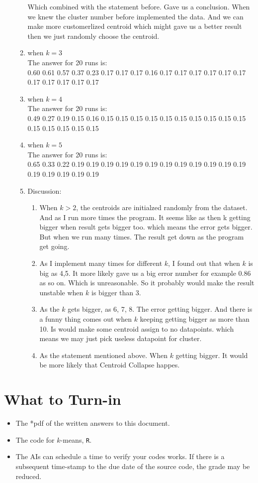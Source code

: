 \documentclass{article}
\begin{document}
\begin{enumerate}
\begin{enumerate}
	Which combined with the statement before. Gave us a conclusion. When we knew the cluster number before implemented the data. And we can make more customerlized centroid which might gave us a better result then we just randomly choose the centroid.
	\item when $k = 3$\\
	The answer for 20 runs is:\\
	0.60 0.61 0.57 0.37 0.23 0.17 0.17 0.17 0.16 0.17 0.17 0.17 0.17 0.17 0.17 0.17 0.17 0.17 0.17 0.17 
	\item when $k = 4$\\
	The answer for 20 runs is:\\
	0.49 0.27 0.19 0.15 0.16 0.15 0.15 0.15 0.15 0.15 0.15 0.15 0.15 0.15 0.15 0.15 0.15 0.15 0.15 0.15 
	\item when $k = 5$ \\
	The answer for 20 runs is:\\
	0.65 0.33 0.22 0.19 0.19 0.19 0.19 0.19 0.19 0.19 0.19 0.19 0.19 0.19 0.19 0.19 0.19 0.19 0.19 0.19
	\item Discussion:\\
	\begin{enumerate}
		\item When $k > 2$, the centroids are initialzed randomly from the dataset. And as I run more times the program. It seems like as then k getting bigger when result gets bigger too. which means the error gets bigger. But when we run many times. The result get down as the program get going.
		\item As I implement many times for different $k$, I found out that when $k$ is big as 4,5. It more likely gave us a big error number for example $0.86$ as so on. Which is unreasonable. So it probably would make the result unstable when $k$ is bigger than 3.
		\item As the $k$ gets bigger, as 6, 7, 8. The error getting bigger. And there is a funny thing comes out when $k$ keeping getting bigger as more than 10. Is would make some centroid assign to no datapoints. which means we may just pick useless datapoint for cluster.
		\item As the statement mentioned above. When $k$ getting bigger. It would be more likely that Centroid Collapse happes.
	\end{enumerate} 
\end{enumerate}

\end{enumerate}

\section*{What to Turn-in}
\begin{itemize}
\item The *pdf of the written answers to this document.
\item The code for $k$-means, \texttt{R}.
\item The AIs can schedule a time to verify your codes works.  If there is a subsequent time-stamp to the due date of the source code, the grade may be reduced.  
\end{itemize}
 

\end{document}
